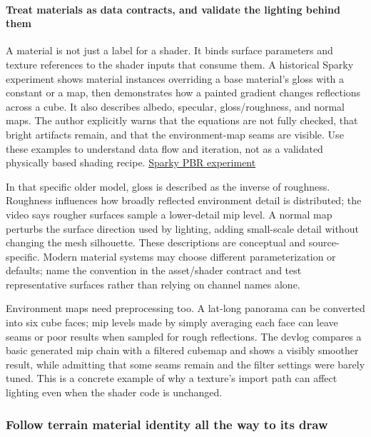 \paragraph{Treat materials as data contracts, and validate the lighting behind them}\label{treat-materials-as-data-contracts-and-validate-the-lighting-behind-them}

A material is not just a label for a shader. It binds surface parameters and texture references to the shader inputs that consume them. A historical Sparky experiment shows material instances overriding a base material's gloss with a constant or a map, then demonstrates how a painted gradient changes reflections across a cube. It also describes albedo, specular, gloss/roughness, and normal maps. The author explicitly warns that the equations are not fully checked, that bright artifacts remain, and that the environment-map seams are visible. Use these examples to understand data flow and iteration, not as a validated physically based shading recipe. \href{https://www.youtube.com/watch?v=zqmgcQd6ayc&t=17m30s}{Sparky PBR experiment}

In that specific older model, gloss is described as the inverse of roughness. Roughness influences how broadly reflected environment detail is distributed; the video says rougher surfaces sample a lower-detail mip level. A normal map perturbs the surface direction used by lighting, adding small-scale detail without changing the mesh silhouette. These descriptions are conceptual and source-specific. Modern material systems may choose different parameterization or defaults; name the convention in the asset/shader contract and test representative surfaces rather than relying on channel names alone.

Environment maps need preprocessing too. A lat-long panorama can be converted into six cube faces; mip levels made by simply averaging each face can leave seams or poor results when sampled for rough reflections. The devlog compares a basic generated mip chain with a filtered cubemap and shows a visibly smoother result, while admitting that some seams remain and the filter settings were barely tuned. This is a concrete example of why a texture's import path can affect lighting even when the shader code is unchanged.

\subsubsection{Follow terrain material identity all the way to its draw}\label{follow-terrain-material-identity-all-the-way-to-its-draw}

